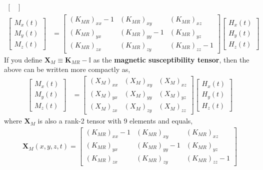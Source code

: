 \begin{itemize}
\begin{align*}
\begin{bmatrix}
      \end{bmatrix} \\
      \begin{bmatrix}
        M_x(t) \\
        M_y(t) \\
        M_z(t)
      \end{bmatrix}
      &=
      \begin{bmatrix}
        (K_{MR})_{xx} - 1 & (K_{MR})_{xy}
        & (K_{MR})_{xz} \\
        (K_{MR})_{yx} & (K_{MR})_{yy} - 1 & (K_{MR})_{yz} \\
        (K_{MR})_{zx} & (K_{MR})_{zy} & (K_{MR})_{zz} - 1
      \end{bmatrix}
      \begin{bmatrix}
        H_x(t) \\
        H_y(t) \\
        H_z(t)
      \end{bmatrix}
    \end{align*}
    If you define \( \mathbf{X}_M \equiv \mathbf{K}_{MR} - \mathbb{I} \) as the
    \textbf{magnetic susceptibility tensor}, then the above can be written more compactly
    as,
    \begin{align*}
      \begin{bmatrix}
        M_x(t) \\
        M_y(t) \\
        M_z(t)
      \end{bmatrix}
      &=
      \begin{bmatrix}
        (X_M)_{xx} & (X_M)_{xy} & (X_M)_{xz} \\
        (X_M)_{yx} & (X_M)_{yy} & (X_M)_{yz} \\
        (X_M)_{zx} & (X_M)_{zy} & (X_M)_{zz}
      \end{bmatrix}
      \begin{bmatrix}
        H_x(t) \\
        H_y(t) \\
        H_z(t)
      \end{bmatrix}
    \end{align*}
    where \( \mathbf{X}_M \) is also a rank-2 tensor with 9 elements and equals,
    \begin{align*}
      \mathbf{X}_M(x,y,z,t) = \begin{bmatrix}
        (K_{MR})_{xx} - 1 & (K_{MR})_{xy} & (K_{MR})_{xz} \\
        (K_{MR})_{yx} & (K_{MR})_{yy} - 1 & (K_{MR})_{yz} \\
        (K_{MR})_{zx} & (K_{MR})_{zy} & (K_{MR})_{zz} - 1
      \end{bmatrix}
    \end{align*}
\end{itemize}

